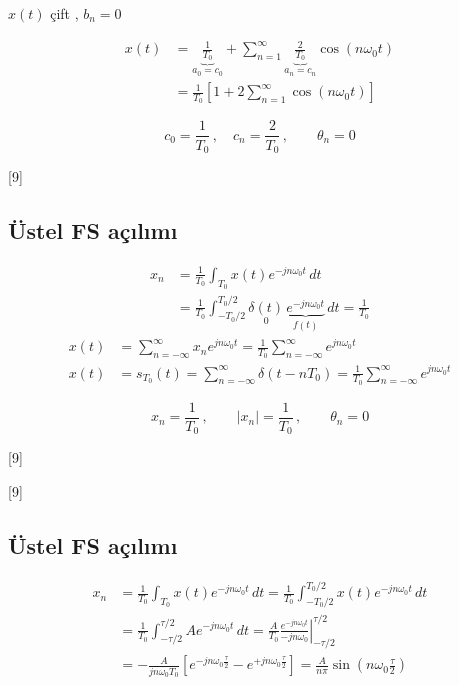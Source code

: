\documentclass[11pt,a4paper]{article}
\begin{document}
$x(t)$ çift , $b_n=0$

\begin{align*}
x(t) &= \underbrace{\frac{1}{T_0}}_{a_0=c_0}+\sum_{n=1}^{\infty}\underbrace{\frac{2}{T_0}}_{a_n=c_n}\cos(n\omega_0 t) \\
&= \frac{1}{T_0}\left[1+2\sum_{n=1}^{\infty}\cos(n\omega_0 t)\right]
\end{align*}

\[ c_0=\frac{1}{T_0}\,,\quad c_n=\frac{2}{T_0}\,,\qquad \theta_n=0 \]

[9]

\subsection{Üstel FS açılımı}
\begin{align*}
x_n &= \frac{1}{T_0}\int_{T_0}x(t)e^{-jn\omega_0 t}\,dt \\
&= \frac{1}{T_0}\int_{-T_0/2}^{T_0/2}\underset{0}{\delta(t)}\,\underbrace{e^{-jn\omega_0 t}}_{f(t)}\,dt=\frac{1}{T_0}
\end{align*}
\begin{align*}
x(t) &= \sum_{n=-\infty}^{\infty}x_n e^{jn\omega_0 t}=\frac{1}{T_0}\sum_{n=-\infty}^{\infty}e^{jn\omega_0 t} \\
x(t) &= s_{T_0}(t)=\sum_{n=-\infty}^{\infty}\delta(t-nT_0)=\frac{1}{T_0}\sum_{n=-\infty}^{\infty}e^{jn\omega_0 t}
\end{align*}

\[ x_n=\frac{1}{T_0}\,,\qquad |x_n|=\frac{1}{T_0}\,,\qquad \theta_n=0 \]

[9]

\begin{ornek}
[9]
\end{ornek}

\subsection{Üstel FS açılımı}
\begin{align*}
x_n &= \frac{1}{T_0}\int_{T_0}x(t)e^{-jn\omega_0 t}\,dt=\frac{1}{T_0}\int_{-T_0/2}^{T_0/2}x(t)e^{-jn\omega_0 t}\,dt \\
&= \frac{1}{T_0}\int_{-\tau/2}^{\tau/2}Ae^{-jn\omega_0 t}\,dt=\frac{A}{T_0}\left.\frac{e^{-jn\omega_0 t}}{-jn\omega_0}\right|_{-\tau/2}^{\tau/2} \\
&= -\frac{A}{jn\omega_0T_0}\left[e^{-jn\omega_0\frac{\tau}{2}}-e^{+jn\omega_0\frac{\tau}{2}}\right]=\frac{A}{n\pi}\sin\left(n\omega_0\frac{\tau}{2}\right)
\end{align*}
\end{document}
